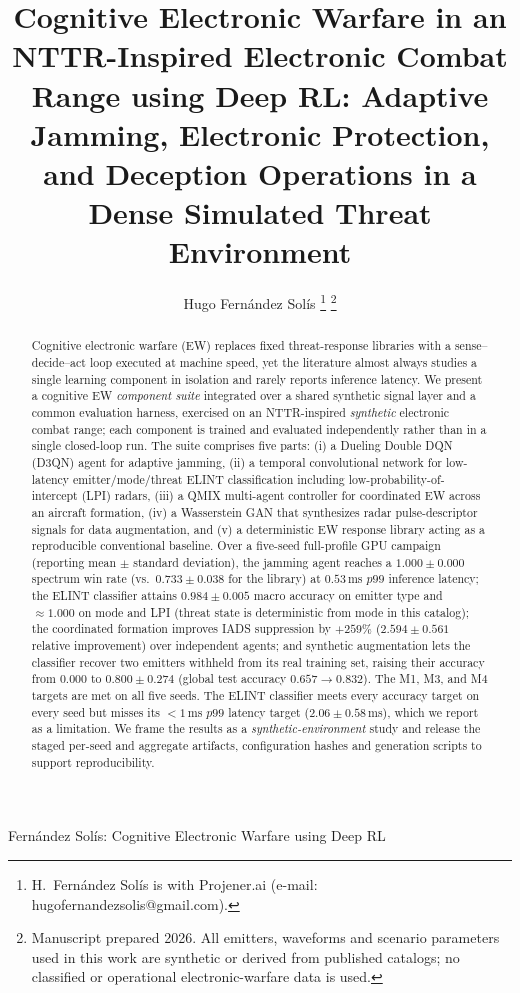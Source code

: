 \documentclass[journal]{IEEEtran}
\begin{document}
\title{Cognitive Electronic Warfare in an NTTR-Inspired Electronic Combat Range using Deep RL:
Adaptive Jamming, Electronic Protection, and Deception Operations in a Dense Simulated Threat
Environment}

\author{Hugo Fern\'andez Sol\'is%
\thanks{H.\ Fern\'andez Sol\'is is with Projener.ai
(e-mail: hugofernandezsolis@gmail.com).}%
\thanks{Manuscript prepared 2026. All emitters, waveforms and scenario parameters used in
this work are synthetic or derived from published catalogs; no classified or operational
electronic-warfare data is used.}}

%
{Fern\'andez Sol\'is: Cognitive Electronic Warfare using Deep RL}

\maketitle

\begin{abstract}
Cognitive electronic warfare (EW) replaces fixed threat-response libraries with a
sense--decide--act loop executed at machine speed, yet the literature almost always studies a
single learning component in isolation and rarely reports inference latency. We present a
cognitive EW \emph{component suite} integrated over a shared synthetic signal layer and a common
evaluation harness, exercised on an NTTR-inspired \emph{synthetic} electronic combat range; each
component is trained and evaluated independently rather than in a single closed-loop run. The
suite comprises five parts: (i) a Dueling Double DQN (D3QN) agent
for adaptive jamming, (ii) a temporal convolutional network for low-latency emitter/mode/threat
ELINT classification including low-probability-of-intercept (LPI) radars, (iii) a QMIX
multi-agent controller for coordinated EW across an aircraft formation, (iv) a Wasserstein GAN
that synthesizes radar pulse-descriptor signals for data augmentation, and (v) a deterministic
EW response library acting as a reproducible conventional baseline. Over a five-seed
full-profile GPU campaign (reporting mean $\pm$ standard deviation), the jamming agent reaches a
$1.000 \pm 0.000$ spectrum win rate (vs.\ $0.733 \pm 0.038$ for the library) at $0.53$\,ms $p99$
inference latency; the ELINT classifier attains $0.984 \pm 0.005$ macro accuracy on emitter type
and $\approx 1.000$ on mode and LPI (threat state is deterministic from mode in this catalog);
the coordinated formation improves IADS suppression
by $+259\%$ ($2.594 \pm 0.561$ relative improvement) over independent agents; and synthetic
augmentation lets the classifier recover two emitters withheld from its real training set,
raising their accuracy from $0.000$ to $0.800 \pm 0.274$ (global test accuracy
$0.657 \to 0.832$). The M1, M3, and M4 targets are met on all five seeds. The ELINT classifier meets
every accuracy target on every seed but misses its $<1$\,ms $p99$ latency target
($2.06 \pm 0.58$\,ms), which we report as a limitation. We frame the results as a
\emph{synthetic-environment} study and release the staged per-seed and aggregate artifacts,
configuration hashes and generation scripts to support reproducibility.
\end{abstract}
\end{document}
